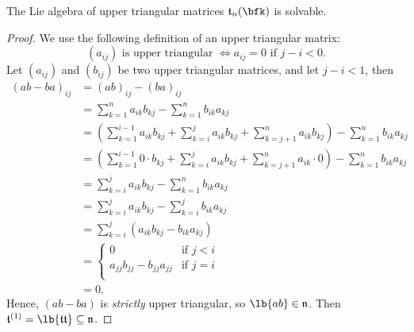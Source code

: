 \documentclass{article}
\DeclarePairedDelimiter\lb\lbrack\rbrack
\newcommand*\talg{\ensuremath{\mathfrak{t}}}
\newcommand*\nalg{\ensuremath{\mathfrak{n}}}
\begin{document}
\begin{proposition}
    The Lie algebra of upper triangular matrices $\talg_n(\bfk)$ is solvable.
\end{proposition}
\begin{proof}
    We use the following definition of an upper triangular matrix:
    \[
        (a_{ij}) \text{ is upper triangular }
        \iff
        a_{ij} = 0 \text{ if } j - i < 0.
    \]
    Let $(a_{ij})$ and $(b_{ij})$ be two upper triangular matrices, and let $j - i < 1$, then
    \begin{align*}
        (ab - ba)_{ij}
        &=
        (ab)_{ij}
        -
        (ba)_{ij}
        \\
        &=
        \sum_{k=1}^n
        a_{ik}b_{kj}
        -
        \sum_{k=1}^n
        b_{ik}a_{kj}
        \\
        &=
        \left(
            \sum_{k=1}^{i-1}
            a_{ik}b_{kj}
            +
            \sum_{k=i}^j
            a_{ik}b_{kj}
            +
            \sum_{k=j+1}^n
            a_{ik}b_{kj}
        \right)
        -
        \sum_{k=1}^n
        b_{ik}a_{kj}
        \\
        &=
        \left(
            \sum_{k=1}^{i-1}
            0 \cdot b_{kj}
            +
            \sum_{k=i}^j
            a_{ik}b_{kj}
            +
            \sum_{k=j+1}^n
            a_{ik} \cdot 0
        \right)
        -
        \sum_{k=1}^n
        b_{ik}a_{kj}
        \\
        &=
        \sum_{k=i}^j
        a_{ik}b_{kj}
        -
        \sum_{k=1}^n
        b_{ik}a_{kj}
        \\
        &=
        \sum_{k=i}^j
        a_{ik}b_{kj}
        -
        \sum_{k=i}^j
        b_{ik}a_{kj}
        \\
        &=
        \sum_{k=i}^j
        (a_{ik}b_{kj} - b_{ik}a_{kj})
        \\
        &=
        \begin{cases}
            0 & \text{if }j < i \\
            a_{jj}b_{jj} - b_{jj}a_{jj} & \text{if }j = i \\
        \end{cases}
        \\
        &=
        0.
    \end{align*}
    Hence, $(ab - ba)$ is \textit{strictly} upper triangular, so $\lb{ab} \in \nalg$.
    Then $\talg^{(1)} = \lb{\talg\talg} \subseteq \nalg$.


\end{proof}
\end{document}
